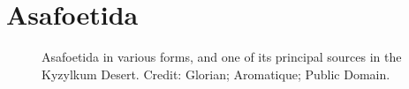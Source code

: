 


\section{Asafoetida}
\label{sec:asafoetida}



\begin{figure}[!ht]
	\vspace{-4ex}
	\centering
	\hfill
	\hfill
	\caption{Asafoetida in various forms, and one of its principal sources  in the Kyzylkum Desert. Credit: Glorian; Aromatique; Public Domain.}
	\label{fig:asafoetida_imgs}
\end{figure}


